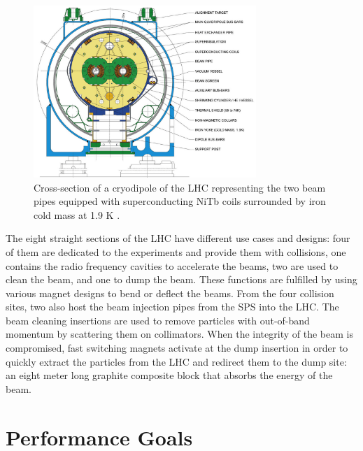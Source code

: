     \begin{figure}[h!]
			\centering
			\includegraphics[width=0.75\textwidth]{img/I-2-LHC/magnet.jpg}
			\caption{Cross-section of a cryodipole of the LHC representing the two beam pipes equipped with superconducting NiTb coils surrounded by iron cold mass at 1.9 K \cite{Evans:2008zzb}.}
			\label{fig:I-2-magnet}
		\end{figure}

    The eight straight sections of the LHC have different use cases and designs: four of them are dedicated to the experiments and provide them with collisions, one contains the radio frequency cavities to accelerate the beams, two are used to clean the beam, and one to dump the beam. These functions are fulfilled by using various magnet designs to bend or deflect the beams. From the four collision sites, two also host the beam injection pipes from the SPS into the LHC. The beam cleaning insertions are used to remove particles with out-of-band momentum by scattering them on collimators. When the integrity of the beam is compromised, fast switching magnets activate at the dump insertion in order to quickly extract the particles from the LHC and redirect them to the dump site: an eight meter long graphite composite block that absorbs the energy of the beam.

	\section{Performance Goals}

